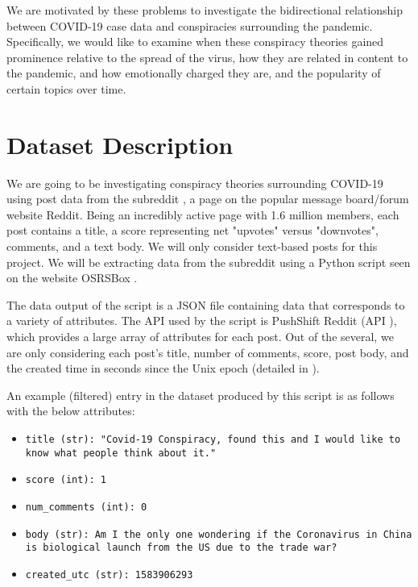 \documentclass[fontsize=11pt]{article}
\begin{document}
We are motivated by these problems to investigate the bidirectional relationship between COVID-19 case data and conspiracies surrounding the pandemic.  Specifically, we would like to examine when these conspiracy theories gained prominence relative to the spread of the virus, how they are related in content to the pandemic, and how emotionally charged they are, and the popularity of certain topics over time.



\section*{Dataset Description}

We are going to be investigating conspiracy theories surrounding COVID-19 using post data from the subreddit \cite{2conspir6:online}, a page on the popular message board/forum website Reddit. Being an incredibly active page with 1.6 million members, each post contains a title, a score representing net "upvotes" versus "downvotes", comments, and a text body. We will only consider text-based posts for this project. We will be extracting data from the subreddit using a Python script seen on the website OSRSBox \cite{OSRSBoxB42:online}.

The data output of the script is a JSON file containing data that corresponds to a variety of attributes. The API used by the script is PushShift Reddit (API \cite{pushshif39:online}), which provides a large array of attributes for each post. Out of the several, we are only considering each post's title, number of comments, score, post body, and the created time in seconds since the Unix epoch (detailed in \cite{Epoch0:online}).

An example (filtered) entry in the dataset produced by this script is as follows with the below attributes:

\begin{itemize}
    \item \texttt{title (str): "Covid-19 Conspiracy, found this and I would like to know what people think about it."}
    \item \texttt{score (int): 1}
    \item \texttt{num\_comments (int): 0}
    \item \texttt{body (str):  Am I the only one wondering if the Coronavirus in China is biological launch from the US due to the trade war?}
    \item \texttt{created\_utc (str): 1583906293}
\end{itemize}
\end{document}
